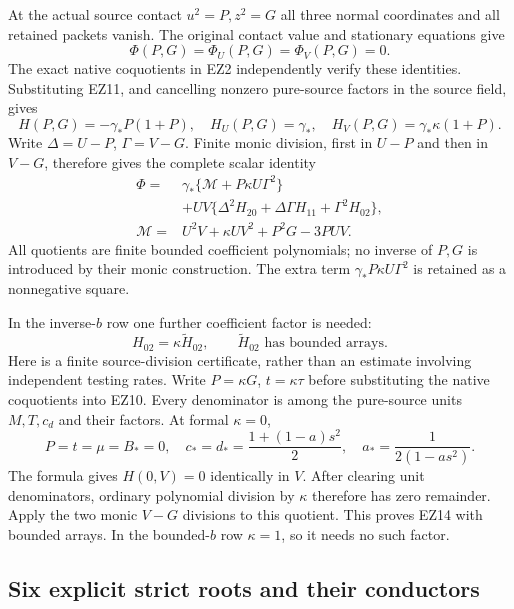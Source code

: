 At the actual source contact $u^2=P,z^2=G$ all three normal
coordinates and all retained packets vanish. The original contact
value and stationary equations give
\[
 \Phi(P,G)=\Phi_U(P,G)=\Phi_V(P,G)=0.                            \tag{EZ12}
\]
The exact native coquotients in EZ2 independently verify these
identities. Substituting EZ11, and cancelling nonzero pure-source
factors in the source field, gives
\[
 H(P,G)=-\gamma_*P(1+P),\quad
 H_U(P,G)=\gamma_*,\quad
 H_V(P,G)=\gamma_*\kappa(1+P).
\]
Write $\Delta=U-P$, $\Gamma=V-G$.
Finite monic division, first in $U-P$ and then in $V-G$,
therefore gives the complete scalar identity
\[
\begin{split}
 \Phi={}&\gamma_*\{\mathcal M+P\kappa U\Gamma^2\}\\
 &+UV\{\Delta^2H_{20}+\Delta\Gamma H_{11}
                                      +\Gamma^2H_{02}\},\\
 \mathcal M={}&U^2V+\kappa UV^2+P^2G-3PUV .
\end{split}                                                     \tag{EZ13}
\]
All quotients are finite bounded coefficient polynomials; no
inverse of $P,G$ is introduced by their monic construction.
The extra term $\gamma_*P\kappa U\Gamma^2$ is retained as a
nonnegative square.

In the inverse-$b$ row one further coefficient factor is needed:
\[
                         H_{02}=\kappa\widetilde H_{02},
 \qquad\widetilde H_{02}\text{ has bounded arrays}.              \tag{EZ14}
\]
Here is a finite source-division certificate, rather than an
estimate involving independent testing rates. Write
$P=\kappa G$, $t=\kappa\tau$ before substituting the native
coquotients into EZ10. Every denominator is among the pure-source
units $M,T,c_d$ and their factors. At formal $\kappa=0$,
\[
 P=t=\mu=B_*=0,\quad
 c_*=d_*=\frac{1+(1-a)s^2}{2},\quad
 a_*=\frac1{2(1-as^2)} .
\]
The formula gives $H(0,V)=0$ identically in $V$.
After clearing unit denominators, ordinary polynomial division
by $\kappa$ therefore has zero remainder. Apply the two monic
$V-G$ divisions to this quotient. This proves EZ14 with bounded
arrays. In the bounded-$b$ row $\kappa=1$, so it needs no such
factor.

\subsection{Six explicit strict roots and their conductors}

